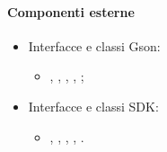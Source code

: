 \documentclass[../Funzionalita.tex]{subfiles}
\begin{document}
			\paragraph*{Componenti esterne}
			\begin{itemize}
			
				\item Interfacce e classi Gson:
				\begin{itemize}
					\item[]	\Gson, \GsonBuilder, \JsonObject, \JsonArray, \JsonParser;
				\end{itemize}
				
				\item Interfacce e classi SDK:
				\begin{itemize}
					\item[]	\SQLiteOpenHelper, \SQLiteDatabase, \Cursor, \ContentValue, \BaseColumns.
				\end{itemize}
				
			\end{itemize}
			
		
		
\end{document}
